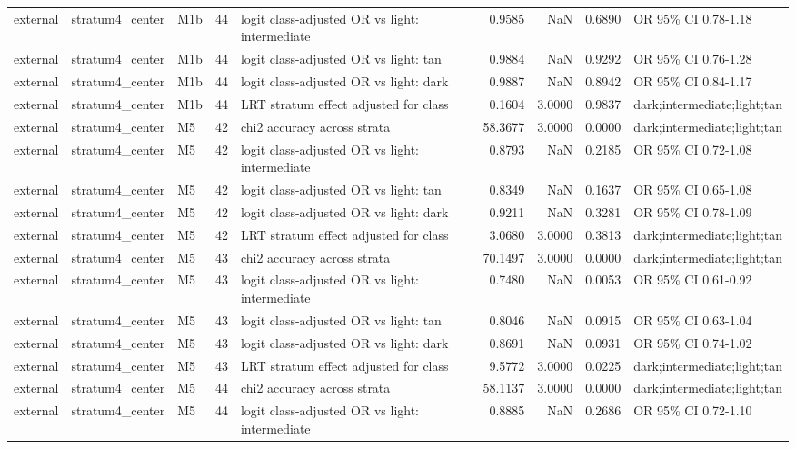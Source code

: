 \begin{tabular}{lllrlrrrl}
external & stratum4\_center & M1b & 44 & logit class-adjusted OR vs light: intermediate & 0.9585 & NaN & 0.6890 & OR 95\% CI 0.78-1.18 \\
external & stratum4\_center & M1b & 44 & logit class-adjusted OR vs light: tan & 0.9884 & NaN & 0.9292 & OR 95\% CI 0.76-1.28 \\
external & stratum4\_center & M1b & 44 & logit class-adjusted OR vs light: dark & 0.9887 & NaN & 0.8942 & OR 95\% CI 0.84-1.17 \\
external & stratum4\_center & M1b & 44 & LRT stratum effect adjusted for class & 0.1604 & 3.0000 & 0.9837 & dark;intermediate;light;tan \\
external & stratum4\_center & M5 & 42 & chi2 accuracy across strata & 58.3677 & 3.0000 & 0.0000 & dark;intermediate;light;tan \\
external & stratum4\_center & M5 & 42 & logit class-adjusted OR vs light: intermediate & 0.8793 & NaN & 0.2185 & OR 95\% CI 0.72-1.08 \\
external & stratum4\_center & M5 & 42 & logit class-adjusted OR vs light: tan & 0.8349 & NaN & 0.1637 & OR 95\% CI 0.65-1.08 \\
external & stratum4\_center & M5 & 42 & logit class-adjusted OR vs light: dark & 0.9211 & NaN & 0.3281 & OR 95\% CI 0.78-1.09 \\
external & stratum4\_center & M5 & 42 & LRT stratum effect adjusted for class & 3.0680 & 3.0000 & 0.3813 & dark;intermediate;light;tan \\
external & stratum4\_center & M5 & 43 & chi2 accuracy across strata & 70.1497 & 3.0000 & 0.0000 & dark;intermediate;light;tan \\
external & stratum4\_center & M5 & 43 & logit class-adjusted OR vs light: intermediate & 0.7480 & NaN & 0.0053 & OR 95\% CI 0.61-0.92 \\
external & stratum4\_center & M5 & 43 & logit class-adjusted OR vs light: tan & 0.8046 & NaN & 0.0915 & OR 95\% CI 0.63-1.04 \\
external & stratum4\_center & M5 & 43 & logit class-adjusted OR vs light: dark & 0.8691 & NaN & 0.0931 & OR 95\% CI 0.74-1.02 \\
external & stratum4\_center & M5 & 43 & LRT stratum effect adjusted for class & 9.5772 & 3.0000 & 0.0225 & dark;intermediate;light;tan \\
external & stratum4\_center & M5 & 44 & chi2 accuracy across strata & 58.1137 & 3.0000 & 0.0000 & dark;intermediate;light;tan \\
external & stratum4\_center & M5 & 44 & logit class-adjusted OR vs light: intermediate & 0.8885 & NaN & 0.2686 & OR 95\% CI 0.72-1.10 \\

\end{tabular}
